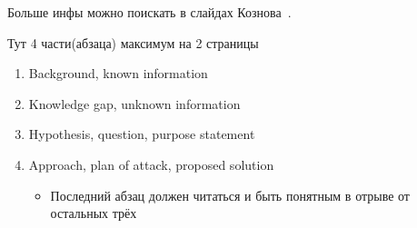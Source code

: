 
Больше инфы можно поискать в слайдах Кознова~\cite{koznov}.

Тут  4 части(абзаца) максимум на 2 страницы
\begin{enumerate}
\item Background, known information
\item Knowledge gap, unknown information
\item  Hypothesis, question, purpose statement 
\item Approach, plan of attack, proposed solution
\begin{itemize}
\item Последний абзац должен читаться и быть понятным в отрыве от остальных трёх
\end{itemize}
\end{enumerate}